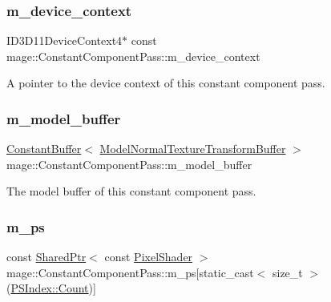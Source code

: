 \subsubsection{\texorpdfstring{m\+\_\+device\+\_\+context}{m\_device\_context}}
{\footnotesize\ttfamily I\+D3\+D11\+Device\+Context4$\ast$ const mage\+::\+Constant\+Component\+Pass\+::m\+\_\+device\+\_\+context\hspace{0.3cm}{\ttfamily [private]}}

A pointer to the device context of this constant component pass. \hypertarget{classmage_1_1_constant_component_pass_a012197b5473955c356d2fbc48f9d3e8b}{}\label{classmage_1_1_constant_component_pass_a012197b5473955c356d2fbc48f9d3e8b} 
\subsubsection{\texorpdfstring{m\+\_\+model\+\_\+buffer}{m\_model\_buffer}}
{\footnotesize\ttfamily \hyperlink{structmage_1_1_constant_buffer}{Constant\+Buffer}$<$ \hyperlink{structmage_1_1_model_normal_texture_transform_buffer}{Model\+Normal\+Texture\+Transform\+Buffer} $>$ mage\+::\+Constant\+Component\+Pass\+::m\+\_\+model\+\_\+buffer\hspace{0.3cm}{\ttfamily [private]}}

The model buffer of this constant component pass. \hypertarget{classmage_1_1_constant_component_pass_a932366be8feba629aa2dd29a844e38b8}{}\label{classmage_1_1_constant_component_pass_a932366be8feba629aa2dd29a844e38b8} 
\subsubsection{\texorpdfstring{m\+\_\+ps}{m\_ps}}
{\footnotesize\ttfamily const \hyperlink{namespacemage_a1e01ae66713838a7a67d30e44c67703e}{Shared\+Ptr}$<$ const \hyperlink{namespacemage_a27ecaf266420ee7a494d64edc0757129}{Pixel\+Shader} $>$ mage\+::\+Constant\+Component\+Pass\+::m\+\_\+ps\mbox{[}static\+\_\+cast$<$ size\+\_\+t $>$(\hyperlink{classmage_1_1_constant_component_pass_a5700234587f2aa0ebdb4f7790704f00bae93f994f01c537c4e2f7d8528c3eb5e9}{P\+S\+Index\+::\+Count})\mbox{]}\hspace{0.3cm}{\ttfamily [private]}}


